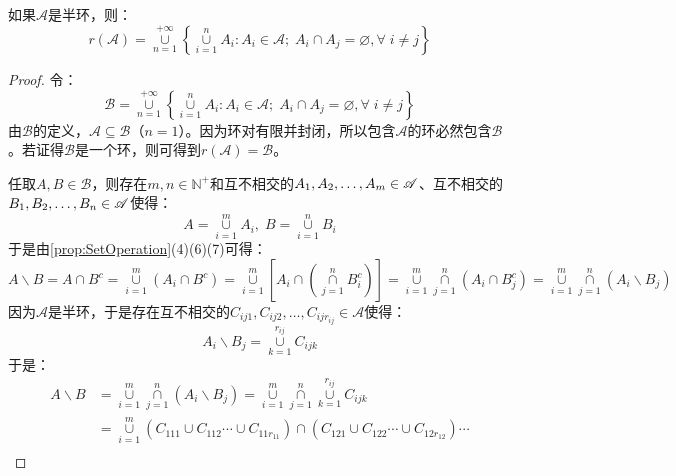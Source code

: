 \begin{theorem}\label{theo:RingGeneratedBySemiring}
	如果$\mathscr{A}$是半环，则：
	\begin{equation*}
		r(\mathscr{A})=
		\underset{n=1}{\overset{+\infty}{\cup}}
		\left\{\underset{i=1}{\overset{n}{\cup}}A_i:A_i\in\mathscr{A};\;A_i\cap A_j=\varnothing,\forall\;i\ne j\right\}
	\end{equation*}
\end{theorem}
\begin{proof}
	令：
	\begin{equation*}
		\mathscr{B}=\underset{n=1}{\overset{+\infty}{\cup}}
		\left\{\underset{i=1}{\overset{n}{\cup}}A_i:A_i\in\mathscr{A};\;A_i\cap A_j=\varnothing,\forall\;i\ne j\right\}
	\end{equation*}
	由$\mathscr{B}$的定义，$\mathscr{A}\subseteq \mathscr{B}$（$n=1$）。因为环对有限并封闭，所以包含$\mathscr{A}$的环必然包含$\mathscr{B}$。若证得$\mathscr{B}$是一个环，则可得到$r(\mathscr{A})=\mathscr{B}$。\par
	任取$A,B\in \mathscr{B}$，则存在$m,n\in\mathbb{N}^+$和互不相交的$A_1, A_2, \dots, A_{m}\in \mathscr{A}$、互不相交的$B_1, B_2, \dots, B_{n}\in \mathscr{A}$使得：
	\begin{equation*}
		A=\underset{i=1}{\overset{m}{\cup}}A_i,\;
		B=\underset{i=1}{\overset{n}{\cup}}B_i
	\end{equation*}
	于是由\cref{prop:SetOperation}(4)(6)(7)可得：
	\begin{equation*}
		A\backslash B=A\cap B^c=\underset{i=1}{\overset{m}{\cup}}(A_i\cap B^c)=\underset{i=1}{\overset{m}{\cup}}\left[A_i\cap\left(\underset{j=1}{\overset{n}{\cap}}B_i^c\right)\right]=\underset{i=1}{\overset{m}{\cup}}\underset{j=1}{\overset{n}{\cap}}(A_i\cap B_j^c)=\underset{i=1}{\overset{m}{\cup}}\underset{j=1}{\overset{n}{\cap}}(A_i\backslash B_j)
	\end{equation*}
	因为$\mathscr{A}$是半环，于是存在互不相交的$C_{ij1},C_{ij2},\dots,C_{ijr_{ij}}\in \mathscr{A}$使得：
	\begin{equation*}
		A_i\backslash B_j=\underset{k=1}{\overset{r_{ij}}{\cup}}C_{ijk}
	\end{equation*}
	于是：
	\begin{align*}
		A\backslash B&=\underset{i=1}{\overset{m}{\cup}}\underset{j=1}{\overset{n}{\cap}}(A_i\backslash B_j)=\underset{i=1}{\overset{m}{\cup}}\underset{j=1}{\overset{n}{\cap}}\underset{k=1}{\overset{r_{ij}}{\cup}}C_{ijk} \\
		&=\underset{i=1}{\overset{m}{\cup}}(C_{111}\cup C_{112}\cdots\cup C_{11r_{11}})\cap(C_{121}\cup C_{122}\cdots\cup C_{12r_{12}})\cdots \\

\end{align*}
\end{proof}
